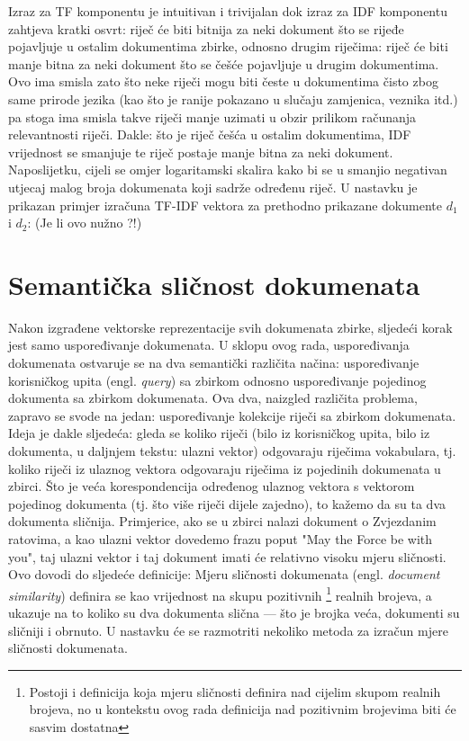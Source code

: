 \documentclass[times, utf8, zavrsni, numeric]{fer}
\begin{document}
Izraz za TF komponentu je intuitivan i trivijalan dok izraz za IDF komponentu zahtjeva kratki osvrt: riječ će biti bitnija za neki dokument što se rijeđe pojavljuje u ostalim dokumentima zbirke, odnosno drugim riječima: riječ će biti manje bitna za neki dokument što se češće pojavljuje u drugim dokumentima. Ovo ima smisla zato što neke riječi mogu biti česte u dokumentima čisto zbog same prirode jezika (kao što je ranije pokazano u slučaju zamjenica, veznika itd.) pa stoga ima smisla takve riječi manje uzimati u obzir prilikom računanja relevantnosti riječi. Dakle: što je riječ češća u ostalim dokumentima, IDF vrijednost se smanjuje te riječ postaje manje bitna za neki dokument. Naposlijetku, cijeli se omjer logaritamski skalira kako bi se u smanjio negativan utjecaj malog broja dokumenata koji sadrže određenu riječ. U nastavku je prikazan primjer izračuna TF-IDF vektora za prethodno prikazane dokumente ${d_1}$ i ${d_2}$: (Je li ovo nužno ?!)

\section{Semantička sličnost dokumenata}
\label{subchap:similarity}
Nakon izgrađene vektorske reprezentacije svih dokumenata zbirke, sljedeći korak jest samo uspoređivanje dokumenata. U sklopu ovog rada, uspoređivanja dokumenata ostvaruje se na dva semantički različita načina: uspoređivanje korisničkog upita (engl. \textit{query}) sa zbirkom odnosno uspoređivanje pojedinog dokumenta sa zbirkom dokumenata.
Ova dva, naizgled različita problema, zapravo se svode na jedan: uspoređivanje kolekcije riječi sa zbirkom dokumenata. Ideja je dakle sljedeća: gleda se koliko riječi (bilo iz korisničkog upita, bilo iz dokumenta, u daljnjem tekstu: ulazni vektor) odgovaraju riječima vokabulara, tj. koliko riječi iz ulaznog vektora odgovaraju riječima iz pojedinih dokumenata u zbirci. Što je veća korespondencija određenog ulaznog vektora s vektorom pojedinog dokumenta (tj. što više riječi dijele zajedno), to kažemo da su ta dva dokumenta sličnija. Primjerice, ako se u zbirci nalazi dokument o Zvjezdanim ratovima, a kao ulazni vektor dovedemo frazu poput "May the Force be with you", taj ulazni vektor i taj dokument imati će relativno visoku mjeru sličnosti. Ovo dovodi do sljedeće definicije:
\newline
Mjeru sličnosti dokumenata (engl. \textit{document similarity}) definira se kao vrijednost na skupu pozitivnih \footnote{Postoji i definicija koja mjeru sličnosti definira nad cijelim skupom realnih brojeva, no u kontekstu ovog rada definicija nad pozitivnim brojevima biti će sasvim dostatna} realnih brojeva, a ukazuje na to koliko su dva dokumenta slična — što je brojka veća, dokumenti su sličniji i obrnuto.
U nastavku će se razmotriti nekoliko metoda za izračun mjere sličnosti dokumenata.
\end{document}

